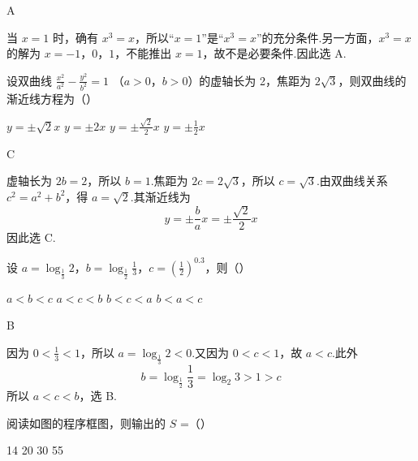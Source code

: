 \begin{answer}
A
\end{answer}

\begin{solution}
当 \(x=1\) 时，确有 \(x^3=x\)，所以“\(x=1\)”是“\(x^3=x\)”的充分条件.另一方面，\(x^3=x\) 的解为 \(x=-1\)，\(0\)，\(1\)，不能推出 \(x=1\)，故不是必要条件.因此选 A.
\end{solution}

\begin{problem}
设双曲线 \(\frac{x^2}{a^2} - \frac{y^2}{b^2} = 1 \) （\(a > 0\)，\(b > 0\)）的虚轴长为 2，焦距为 \(2\sqrt{3}\)，则双曲线的渐近线方程为（\quad）

\choices
    {\(y = \pm \sqrt{2} x\)}
    {\(y = \pm 2x\)}
    {\(y = \pm \frac{\sqrt{2}}{2} x\)}
    {\(y = \pm \frac{1}{2} x\)}
\end{problem}

\begin{answer}
C
\end{answer}

\begin{solution}
虚轴长为 \(2b=2\)，所以 \(b=1\).焦距为 \(2c=2\sqrt{3}\)，所以 \(c=\sqrt{3}\).由双曲线关系 \(c^2=a^2+b^2\)，得 \(a=\sqrt{2}\).其渐近线为
\[
y=\pm\frac{b}{a}x=\pm\frac{\sqrt{2}}{2}x
\]
因此选 C.
\end{solution}

\begin{problem}
设 \(a = \log_{\frac{1}{3}} 2\)，\(b = \log_{\frac{1}{2}} \frac{1}{3}\)，\(c = \left(\frac{1}{2}\right)^{0.3}\)，则（\quad）

\choices
    {\(a < b < c\)}
    {\(a < c < b\)}
    {\(b < c < a\)}
    {\(b < a < c\)}
\end{problem}

\begin{answer}
B
\end{answer}

\begin{solution}
因为 \(0<\frac13<1\)，所以 \(a=\log_{\frac{1}{3}}2<0\).又因为 \(0<c<1\)，故 \(a<c\).此外
\[
b=\log_{\frac{1}{2}}\frac13=\log_2 3>1>c
\]
所以 \(a<c<b\)，选 B.
\end{solution}

\begin{problem}
阅读如图的程序框图，则输出的 \(S\) =（\quad）


\choices
    {14}
    {20}
    {30}
    {55}
\end{problem}

